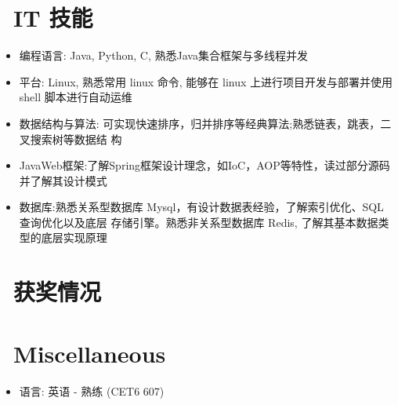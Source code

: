 \documentclass{resume}
\begin{document}
\section{\faCogs\ IT 技能}
\begin{itemize}[parsep=0.5ex]
  \item 编程语言: Java, Python, C, 熟悉Java集合框架与多线程并发
  \item 平台: Linux, 熟悉常用 linux 命令, 能够在 linux 上进行项目开发与部署并使用 shell 脚本进行自动运维
  \item 数据结构与算法: 可实现快速排序，归并排序等经典算法;熟悉链表，跳表，二叉搜索树等数据结 构
  \item JavaWeb框架:了解Spring框架设计理念，如IoC，AOP等特性，读过部分源码并了解其设计模式
  \item 数据库:熟悉关系型数据库 Mysql，有设计数据表经验，了解索引优化、SQL 查询优化以及底层
 存储引擎。熟悉非关系型数据库 Redis, 了解其基本数据类型的底层实现原理
\end{itemize}

\section{\faHeartO\ 获奖情况}

\section{\faInfo\ Miscellaneous}
\begin{itemize}[parsep=0.5ex]
  \item 语言: 英语 - 熟练 (CET6 607)
\end{itemize}

%
%
\end{document}

